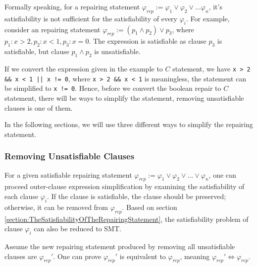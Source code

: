 Formally speaking, for a repairing statement $\varphi _{rep} := \varphi _{1} \vee \varphi _{2} \vee \dots \varphi _{n}$, it's satisfiability is not sufficient for the satisfiability of every $\varphi _{i}$.
For example, consider an repairing statement $\varphi _{rep} := (p_{1} \wedge p_{2}) \vee p_{3}$, where $p_{1} : x > 2, p_{2} : x < 1, p_{3} : x = 0$. The expression is satisfiable as clause $p_{3}$ is satisfiable,
but clause $p_{1} \wedge p_{2}$ is unsatisfiable.

If we convert the expression given in the example to $C$ statement, we have \lstinline{x > 2 && x < 1 || x != 0}, where \lstinline|x > 2 && x < 1| is meaningless, the statement can be simplified to \lstinline|x != 0|.
Hence, before we convert the boolean repair to $C$ statement, there will be ways to simplify the statement, removing unsatisfiable clauses is one of them.

In the following sections, we will use three different ways to simplify the repairing statement.

\subsubsection{Removing Unsatisfiable Clauses}
For a given satisfiable repairing statement $\varphi _{rep} := \varphi _{1} \vee \varphi _{2} \vee \dots \vee \varphi _{n}$, one can proceed outer-clause expression simplification by examining the satisfiability of each clause $\varphi _{i}$.
If the clause is satisfiable, the clause should be preserved; otherwise, it can be removed from $\varphi _{rep}$.
Based on section \ref{section:TheSatisfiabilityOfTheRepairingStatement}, the satisfiability problem of clause $\varphi _{i}$ can also be reduced to SMT.

Assume the new repairing statement produced by removing all unsatisfiable clauses are $\varphi _{rep}'$.
One can prove $\varphi _{rep}'$ is equivalent to $\varphi _{rep}$, meaning $\varphi _{rep}' \Longleftrightarrow \varphi _{rep}$.

